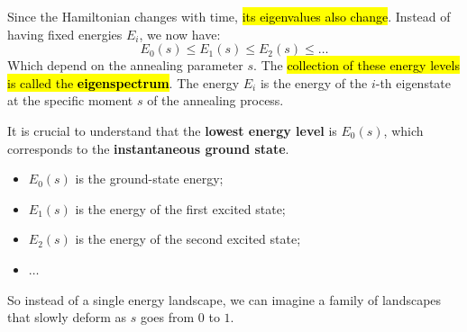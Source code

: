 \highspace
Since the Hamiltonian changes with time, \hl{its eigenvalues also change}. Instead of having fixed energies $E_i$, we now have:
\begin{equation*}
    E_{0}(s) \leq E_{1}(s) \leq E_{2}(s) \leq \ldots
\end{equation*}
Which depend on the annealing parameter $s$. The \hl{collection of these energy levels is called the \textbf{eigenspectrum}}. The energy $E_i$ is the energy of the $i$-th eigenstate at the specific moment $s$ of the annealing process.

\highspace
It is crucial to understand that the \textbf{lowest energy level} is $E_{0}(s)$, which corresponds to the \textbf{instantaneous ground state}.
\begin{itemize}
    \item $E_{0}(s)$ is the ground-state energy;
    \item $E_{1}(s)$ is the energy of the first excited state;
    \item $E_{2}(s)$ is the energy of the second excited state;
    \item $\ldots$
\end{itemize}
So instead of a single energy landscape, we can imagine a family of landscapes that slowly deform as $s$ goes from $0$ to $1$.

